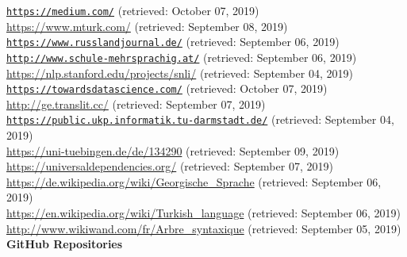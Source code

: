 \href{https://medium.com/pachyderm-data/hold-your-machine-learning-and-ai-models-accountable-de887177174c}{\texttt{https://medium.com/}} (retrieved: October 07, 2019) \\[2mm]
\url{https://www.mturk.com/} (retrieved: September 08, 2019) \\[2mm]
\href{https://www.russlandjournal.de/russische-literatur/gedichte-von-alexander-puschkin/}{\texttt{https://www.russlandjournal.de/}} (retrieved: September 06, 2019) \\[2mm]
\href{http://www.schule-mehrsprachig.at/fileadmin/schule_mehrsprachig/redaktion/sprachensteckbriefe/pdf/ssb_tuerkisch_neu.pdf}{\texttt{http://www.schule-mehrsprachig.at/}} (retrieved: September 06, 2019) \\[2mm]
\url{https://nlp.stanford.edu/projects/snli/} (retrieved: September 04, 2019) \\[2mm]
\href{https://towardsdatascience.com/the-black-box-metaphor-in-machine-learning-4e57a3a1d2b0}{\texttt{https://towardsdatascience.com/}} (retrieved: October 07, 2019) \\[2mm]
\url{http://ge.translit.cc/} (retrieved: September 07, 2019) \\[2mm]
\href{https://public.ukp.informatik.tu-darmstadt.de/arxiv2018-xling-sentence-embeddings/translated-snli/en-de-translated-snli-4x.zip}{\texttt{https://public.ukp.informatik.tu-darmstadt.de/}} (retrieved: September 04, 2019) \\[2mm]
\url{https://uni-tuebingen.de/de/134290} (retrieved: September 09, 2019) \\[2mm]
\url{https://universaldependencies.org/} (retrieved: September 07, 2019) \\[2mm]
\url{https://de.wikipedia.org/wiki/Georgische_Sprache} (retrieved: September 06, 2019) \\[2mm]
\url{https://en.wikipedia.org/wiki/Turkish_language} (retrieved: September 06, 2019) \\[2mm]
\url{http://www.wikiwand.com/fr/Arbre_syntaxique} (retrieved: September 05, 2019) \\[2mm]

\textbf{GitHub Repositories\github}

